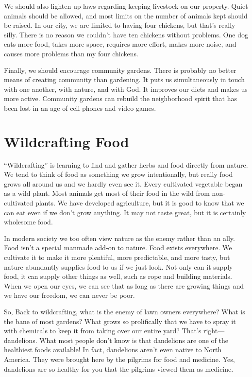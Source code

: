 We should also lighten up laws regarding keeping livestock on our
property. Quiet animals should be allowed, and most limits on the
number of animals kept should be raised. In our city, we are limited to
having four chickens, but that’s really silly. There is no reason we
couldn’t have ten chickens without problems. One dog eats more food,
takes more space, requires more effort, makes more noise, and causes
more problems than my four chickens.

Finally, we should encourage community gardens. There is probably no
better means of creating community than gardening. It puts us
simultaneously in touch with one another, with nature, and with God. It
improves our diets and makes us more active. Community gardens can
rebuild the neighborhood spirit that has been lost in an age of cell
phones and video games.

\section{Wildcrafting Food}

“Wildcrafting” is learning to find and gather herbs and food directly
from nature. We tend to think of food as something we grow
intentionally, but really food grows all around us and we hardly even
see it. Every cultivated vegetable began as a wild plant. Most animals
get most of their food
in the wild from
non-cultivated plants. We have developed agriculture, but it is good to
know that we can eat even if we don’t grow anything. It may not taste
great, but it is certainly wholesome food.

In modern society we too often view nature as the enemy rather than an
ally. Food isn’t a special manmade add-on to nature. Food exists
everywhere. We cultivate it to make it more plentiful, more
predictable, and more tasty, but nature abundantly supplies food to us
if we just look. Not only can it supply food, it can supply other
things as
well, such as rope
and building materials. When we open our eyes, we can see that as long
as there are growing things and we have our freedom, we can never be
poor.

So, Back to wildcrafting, what is the enemy of lawn owners everywhere? 
What is the bane of most gardens? What grows so prolifically that we
have to spray it with chemicals to keep it from taking over our entire
yard?  That’s right—dandelions. What most people don’t know is that
dandelions are one of the healthiest foods available!  In fact,
dandelions aren’t even native to North America. They were brought here
by the pilgrims for food and medicine. Yes, dandelions are so healthy
for you that the pilgrims viewed them as medicine.

